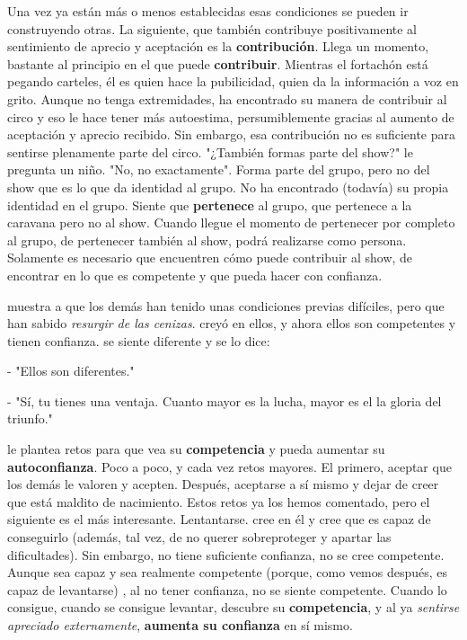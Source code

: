 Una vez ya están más o menos establecidas esas condiciones se pueden ir construyendo otras. 
%
La siguiente, que también contribuye positivamente al sentimiento de aprecio y aceptación es la \textbf{contribución}.
%
Llega un momento, bastante al principio en el que \nick puede \textbf{contribuir}. 
%
Mientras el fortachón está pegando carteles, él es quien hace la pubilicidad, quien da la información a voz en grito. 
%
Aunque no tenga extremidades, ha encontrado su manera de contribuir al circo y eso le hace tener más autoestima, persumiblemente gracias al aumento de aceptación y aprecio recibido.
%
Sin embargo, esa contribución no es suficiente para sentirse plenamente parte del circo. 
%
"¿También formas parte del show?" le pregunta un niño. "No, no exactamente". 
%
Forma parte del grupo, pero no del show que es lo que da identidad al grupo. 
%
No ha encontrado (todavía) su propia identidad en el grupo.
%
Siente que \textbf{pertenece} al grupo, que pertenece a la caravana pero no al show.
%
Cuando llegue el momento de pertenecer por completo al grupo, de pertenecer también al show, \nick podrá realizarse como persona.
%
Solamente es necesario que encuentren cómo puede \nick contribuir al show, de encontrar en lo que \nick es competente y que pueda hacer con confianza.

\mendez muestra a \nick que los demás han tenido unas condiciones previas difíciles, pero que han sabido \textit{resurgir de las cenizas}.
%
\mendez creyó en ellos, y ahora ellos son competentes y tienen confianza.
%
\nick se siente diferente y se lo dice:

- "Ellos son diferentes."

- "Sí, tu tienes una ventaja.
%
Cuanto mayor es la lucha, mayor es el la gloria del triunfo."

\mendez le plantea retos para que vea su \textbf{competencia} y pueda aumentar su \textbf{autoconfianza}.
%
Poco a poco, y cada vez retos mayores.
%
El primero, aceptar que los demás le valoren y acepten. 
%
Después, aceptarse a sí mismo y dejar de creer que está maldito de nacimiento.
%
Estos retos ya los hemos comentado, pero el siguiente es el más interesante. Lentantarse. \mendez cree en él y cree que es capaz de conseguirlo (además, tal vez, de no querer sobreproteger y apartar las dificultades).
%
Sin embargo, \nick no tiene suficiente confianza, no se cree competente. 
%
Aunque sea capaz y sea realmente competente (porque, como vemos después, es capaz de levantarse) , al no tener confianza, no se siente competente.
%
Cuando lo consigue, cuando se consigue levantar, 
%
descubre su \textbf{competencia}, y al ya \textit{sentirse apreciado externamente}, \textbf{aumenta su confianza} en sí mismo.


